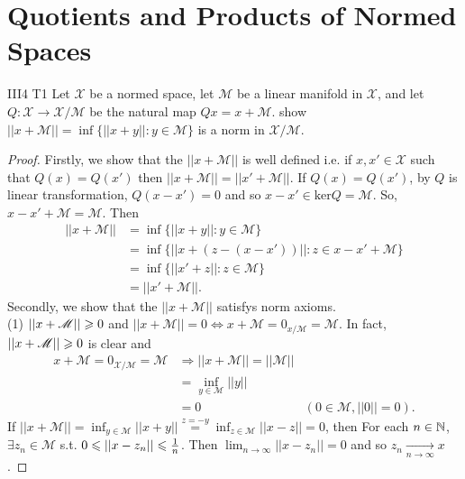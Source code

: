 \chapter{Quotients and Products of Normed Spaces}\label{chp:3_4}

\begin{exercise}{III4 T1}{}
    Let $\mathscr{X}$ be a normed space, let $\mathscr{M}$ be a linear manifold in $\mathscr{X}$, 
    and let $Q:\mathscr{X}\rightarrow \mathscr{X}/\mathscr{M}$ be the natural map $Qx=x+\mathscr{M}$.
    show $||x+\mathscr{M}||=\inf\{||x+y||:y\in \mathscr{M}\}$ is a norm in $\mathscr{X}/\mathscr{M}$.
    
\end{exercise}

\begin{proof}
    Firstly, we show that the $||x+\mathscr{M}||$ is well defined i.e.
    if $x,x'\in\mathscr{X}$ such that $Q(x)=Q(x')$ then $||x+\mathscr{M}||=||x'+\mathscr{M}||$.
    If $Q(x)=Q(x')$, by $Q$ is linear transformation, $Q(x-x')=0$ and so $x-x'\in \text{ker}Q=\mathscr{M}$. 
    So, $x-x'+\mathscr{M}=\mathscr{M}$.
    Then
    \begin{align*}
        ||x+\mathscr{M}||&=\inf\{||x+y||:y\in\mathscr{M}\}\\
                        &=\inf\{||x+(z-(x-x'))||:z\in x-x'+\mathscr{M}\}\\
                        &=\inf\{||x'+z||:z\in \mathscr{M}\}\\
                        &=||x'+\mathscr{M}||.
    \end{align*}
    Secondly, we show that the $||x+\mathscr{M}||$ satisfys norm axioms.\\
    (1) $||x+\mathscr{M}||\geqslant 0$ and $||x+\mathscr{M}||=0\Leftrightarrow x+\mathscr{M}=0_{x/\mathscr{M}}=\mathscr{M}$. 
    In fact, $||x+\mathscr{M}||\geqslant 0$ is clear and 
    \begin{align*}
        x+\mathscr{M}=0_{\mathscr{X}/\mathscr{M}}=\mathscr{M}&\Rightarrow ||x+\mathscr{M}||=||\mathscr{M}||\\
        &= \inf_{y\in\mathscr{M}} ||y||\\
        & =0 & (0\in\mathscr{M},||0||=0).
    \end{align*}
        If $||x+\mathscr{M}||=\inf_{y\in\mathscr{M}}||x+y||\overset{z=-y}{=}\inf_{z\in \mathscr{M}}||x-z||=0$, 
        then For each  $n\in\mathbb{N}$, $\exists z_n\in\mathscr{M}$ s.t.
        $0\leqslant||x-z_n||\leqslant \frac{1}{n}$. Then $\lim_{n\rightarrow \infty}||x-z_n||=0$ and so $z_n\underset{n\rightarrow \infty}{\longrightarrow} x$.

\end{proof}
